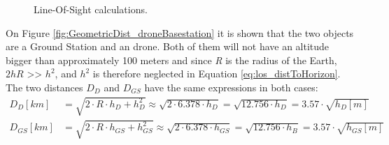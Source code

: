 \begin{figure}[H]
    \hfill
	\hfill
    \hfill
    \caption{Line-Of-Sight calculations.}
\end{figure}

On Figure \ref{fig:GeometricDist_droneBasestation} it is shown that the two objects are a Ground Station and an drone. Both of them will not have an altitude bigger than approximately 100 meters and since \textit{R} is the radius of the Earth, $2hR$ >> $h^2$, and $h^2$ is therefore neglected in Equation \ref{eq:los_distToHorizon}. The two distances $D_D$ and $D_{GS}$ have the same expressions in both cases:
\begin{align*}
	D_D [km] &= \sqrt{2\cdot R \cdot h_D + h_{D}^2} \approx \sqrt{2\cdot 6.378\cdot h_D} = \sqrt{12.756\cdot h_D} = 3.57\cdot \sqrt{h_D[m]} \\
	D_{GS} [km] &= \sqrt{2\cdot R \cdot h_{GS} + h_{GS}^2} \approx \sqrt{2\cdot 6.378\cdot h_{GS}} = \sqrt{12.756\cdot h_B} = 3.57\cdot \sqrt{h_{GS}[m]}
\end{align*}

